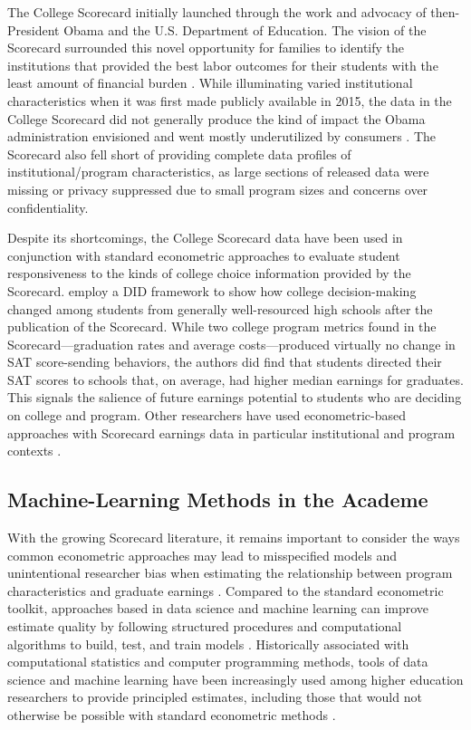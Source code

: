 \documentclass[a4paper, 12pt]{article}
\begin{document}
The College Scorecard initially launched through the work and advocacy of then-President Obama and the U.S. Department of Education. The vision of the Scorecard surrounded this novel opportunity for families to identify the institutions that provided the best labor outcomes for their students with the least amount of financial burden \parencite{obama_2013}. While illuminating varied institutional characteristics when it was first made publicly available in 2015, the data in the College Scorecard did not generally produce the kind of impact the Obama administration envisioned and went mostly underutilized by consumers \parencite{huntington2016search}. The Scorecard also fell short of providing complete data profiles of institutional/program characteristics, as large sections of released data were missing or privacy suppressed due to small program sizes and concerns over confidentiality.

Despite its shortcomings, the College Scorecard data have been used in conjunction with standard econometric approaches to evaluate student responsiveness to the kinds of college choice information provided by the Scorecard. \textcite{hurwitz_student_2018} employ a DID framework to show how college decision-making changed among students from generally well-resourced high schools after the publication of the Scorecard. While two college program metrics found in the Scorecard---graduation rates and average costs---produced virtually no change in SAT score-sending behaviors, the authors did find that students directed their SAT scores to schools that, on average, had higher median earnings for graduates. This signals the salience of future earnings potential to students who are deciding on college and program. Other researchers have used econometric-based approaches with Scorecard earnings data in particular institutional and program contexts \parencite{boland_effect_2021, elu_earnings_2019, mabel_value_2020, seaman_assessing_2017}.

\subsection*{Machine-Learning Methods in the Academe}

With the growing Scorecard literature, it remains important to consider the ways common econometric approaches may lead to misspecified models and unintentional researcher bias when estimating the relationship between program characteristics and graduate earnings \parencite{Imbens_2004}. Compared to the standard econometric toolkit, approaches based in data science and machine learning can improve estimate quality by following structured procedures and computational algorithms to build, test, and train models \parencite{Hastie_etal_2016}. Historically associated with computational statistics and computer programming methods, tools of data science and machine learning have been increasingly used among higher education researchers to provide principled estimates, including those that would not otherwise be possible with standard econometric methods \parencite{skinner2021civic, aulck2017predicting, savvas_etal_2021, Zeineddine_2021}.
\end{document}
